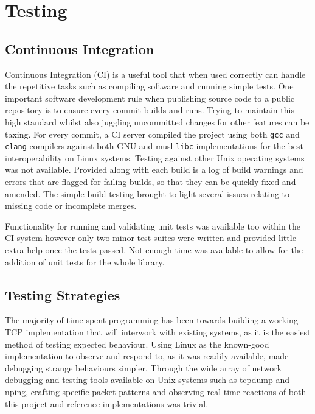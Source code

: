 

\chapter{Testing}\label{chp:testing}

    \section{Continuous Integration}
    Continuous Integration (CI) is a useful tool that when used correctly can handle the repetitive tasks such as compiling software and running simple tests. One important software development rule when publishing source code to a public repository is to ensure every commit builds and runs. Trying to maintain this high standard whilst also juggling uncommitted changes for other features can be taxing.
    For every commit, a CI server compiled the project using both \texttt{gcc} and \texttt{clang} compilers against both GNU and musl \texttt{libc} implementations for the best interoperability on Linux systems. Testing against other Unix operating systems was not available. Provided along with each build is a log of build warnings and errors that are flagged for failing builds, so that they can be quickly fixed and amended. The simple build testing brought to light several issues relating to missing code or incomplete merges.
    
    Functionality for running and validating unit tests was available too within the CI system however only two minor test suites were written and provided little extra help once the tests passed. Not enough time was available to allow for the addition of unit tests for the whole library.


    \section{Testing Strategies}
    The majority of time spent programming has been towards building a working TCP implementation that will interwork with existing systems, as it is the easiest method of testing expected behaviour. Using Linux as the known-good implementation to observe and respond to, as it was readily available, made debugging strange behaviours simpler. Through the wide array of network debugging and testing tools available on Unix systems such as tcpdump and nping, crafting specific packet patterns and observing real-time reactions of both this project and reference implementations was trivial.

